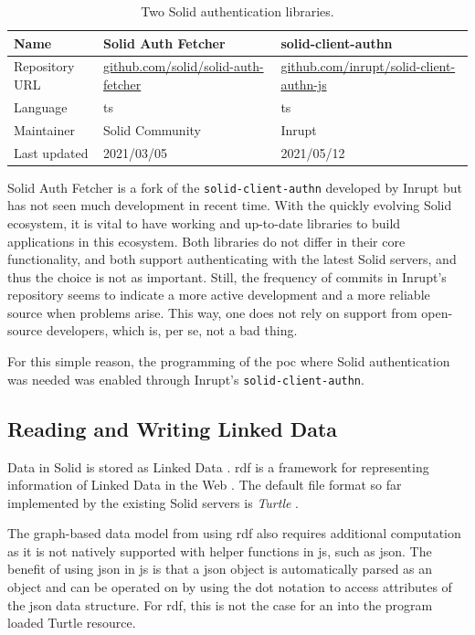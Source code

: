 \begin{table}[h!]
    \centering
    \begin{tabular}{| l | l | l |} 
     \hline
     Name & Solid Auth Fetcher & solid-client-authn \\
     \hline
     Repository URL & \url{github.com/solid/solid-auth-fetcher} & \url{github.com/inrupt/solid-client-authn-js} \\
     \hline
     Language & \gls{ts} & \gls{ts} \\
     \hline
     Maintainer & Solid Community & Inrupt \\
     \hline
     Last updated & 2021/03/05 & 2021/05/12 \\
     \hline
    \end{tabular}
    \vspace{0.75cm}
    \caption{Two Solid authentication libraries.}
    \label{table:0}
\end{table}

Solid Auth Fetcher is a fork of the \texttt{solid-client-authn} developed by Inrupt but has not seen much development in recent time. With the quickly evolving Solid ecosystem, it is vital to have working and up-to-date libraries to build applications in this ecosystem. Both libraries do not differ in their core functionality, and both support authenticating with the latest Solid servers, and thus the choice is not as important. Still, the frequency of commits in Inrupt's repository seems to indicate a more active development and a more reliable source when problems arise. This way, one does not rely on support from open-source developers, which is, per se, not a bad thing.

For this simple reason, the programming of the \gls{poc} where Solid authentication was needed was enabled through Inrupt's \texttt{solid-client-authn}.

\subsection{Reading and Writing Linked Data}

Data in Solid is stored as Linked Data \cite{Malhotra:15:LDP}. \gls{rdf} is a framework for representing information of Linked Data in the Web \cite{Cyganiak:14:RCA}. The default file format so far implemented by the existing Solid servers is \textit{Turtle} \cite{Prud:hommeaux:14:RT}.

The graph-based data model from using \gls{rdf} also requires additional computation as it is not natively supported with helper functions in \gls{js}, such as \gls{json}. The benefit of using \gls{json} in \gls{js} is that a \gls{json} object is automatically parsed as an object and can be operated on by using the dot notation to access attributes of the \gls{json} data structure. For \gls{rdf}, this is not the case for an into the program loaded Turtle resource.

